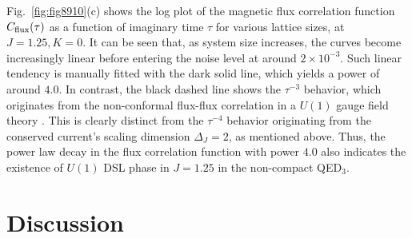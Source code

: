 \documentclass[aps,prl,twocolumn,superscriptaddress,showpacs,longbibliography]{revtex4-2}
\newcommand{\tx}[1]{\textmd{#1}}
\begin{document}
Fig.~\ref{fig:fig8910}(c) shows the log plot of the magnetic flux correlation function $C_\tx{flux}(\tau)$ as a function of imaginary time $\tau$ for various lattice sizes, at $J=1.25, K=0$. 
It can be seen that, as system size increases, the curves become increasingly linear before entering the noise level at around $2\times 10^{-3}$. Such linear tendency is manually fitted with the dark solid line, which yields a power of around $4.0$. In contrast, the black dashed line shows the $\tau^{-3}$ behavior, which originates from the non-conformal flux-flux correlation in a $U(1)$ gauge field theory \cite{chenEmergent2025}.
This is clearly distinct from the $\tau^{-4}$ behavior originating from the conserved current's scaling dimension $\Delta_J = 2$, as mentioned above. Thus, the power law decay in the flux correlation function with power $4.0$ also indicates the existence of $U(1)$ DSL phase in $J=1.25$ in the non-compact QED$_3$.
















\section{Discussion}
\end{document}

